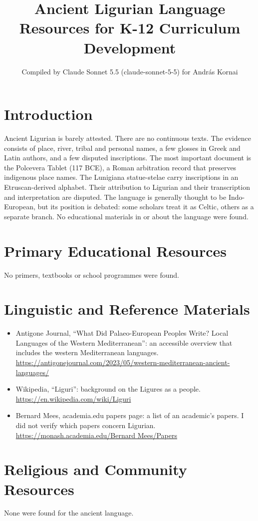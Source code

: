\documentclass[12pt]{article}
\title{Ancient Ligurian Language Resources for K-12 Curriculum Development}
\author{Compiled by Claude Sonnet 5.5 (claude-sonnet-5-5) for Andr\'as Kornai}
\date{}
\begin{document}
\maketitle

\section{Introduction}
Ancient Ligurian is barely attested. There are no continuous texts. The evidence consists of place, river, tribal and personal names, a few glosses in Greek and Latin authors, and a few disputed inscriptions. The most important document is the Polcevera Tablet (117 BCE), a Roman arbitration record that preserves indigenous place names. The Lunigiana statue-stelae carry inscriptions in an Etruscan-derived alphabet. Their attribution to Ligurian and their transcription and interpretation are disputed. The language is generally thought to be Indo-European, but its position is debated: some scholars treat it as Celtic, others as a separate branch. No educational materials in or about the language were found.

\section{Primary Educational Resources}
No primers, textbooks or school programmes were found.

\section{Linguistic and Reference Materials}
\begin{itemize}
\item Antigone Journal, ``What Did Palaeo-European Peoples Write? Local Languages of the Western Mediterranean'': an accessible overview that includes the western Mediterranean languages. \url{https://antigonejournal.com/2023/05/western-mediterranean-ancient-languages/}
\item Wikipedia, ``Liguri'': background on the Ligures as a people. \url{https://en.wikipedia.com/wiki/Liguri}
\item Bernard Mees, academia.edu papers page: a list of an academic's papers. I did not verify which papers concern Ligurian. \url{https://monash.academia.edu/Bernard Mees/Papers}
\end{itemize}

\section{Religious and Community Resources}
None were found for the ancient language.
\end{document}
